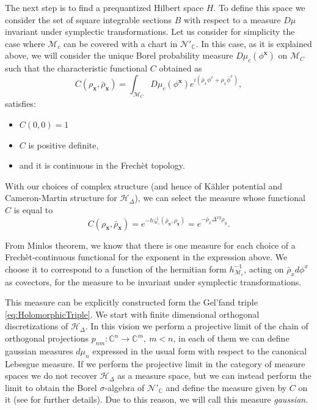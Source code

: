 \documentclass[12pt]{article}%
\begin{document}
The next step is to find a prequantized Hilbert space $H$. To define this space we consider the set of square integrable sections $B$ with respect to a measure $D\mu$ invariant under symplectic transformations. Let us consider for simplicity the case where $\mathcal{M}_c$ can be covered with a chart in $\mathcal{N}'_\mathbb{C}$. In this case, as it is explained above, we will consider the unique Borel probability measure $D\mu_c(\phi^\mathbf{x})$ on $\mathcal{M}_C$ such that the characteristic functional $C$ obtained as  
\begin{equation}
\label{eq:gaussianmeasure}
C(\rho_{\mathbf{x}}, \bar \rho_{\mathbf{x}})=\int_{\mathcal{M}_C}D\mu_c(\phi^\mathbf{x} )e^{i (\bar\rho_x\phi^x+\rho_x\bar \phi^x) },
\end{equation}
satisfies:
\begin{itemize}
    \item $C(0,0)=1$
    \item $C$ is positive definite,
    \item and it is continuous in the Frechèt topology.
\end{itemize}

 
   With our choices of complex structure (and hence of Kähler potential and Cameron-Martin structure for $\mathcal{H}_\Delta$),  we can select the measure whose functional $C$ is equal to
\begin{equation}
\label{eq:C}
C(\rho_\mathbf{x}, \bar \rho_\mathbf{x})=e^{-h^{-1}_{\mathcal{M}_c}(\bar \rho_\mathbf{x}, \rho_\mathbf{x})}= e^{-\bar \rho_{x}\Delta^{xy} \rho_{y}}.
\end{equation}

From Minlos theorem, we know that there is one measure for each choice of a Frechèt-continuous functional for the exponent in the expression above.  We choose it to correspond to a function of the hermitian form   $h^{-1}_{\mathcal{M}_c}$, acting on  $\bar\rho_x d\phi^x$ as covectors, for the measure to be invariant under symplectic transformations. 

This measure can be explicitly constructed form the Gel'fand triple \eqref{eq:HolomorphicTriple}. We start with finite dimensional orthogonal discretizations of $\mathcal{H}_\Delta$. In this vision we perform a projective limit of the chain of orthogonal projections  $p_{nm}:\mathbb{C}   ^n\to \mathbb{C}^m,\ m<n$, in each of them we can define gaussian measures $d\mu_n$ expressed in the usual form with respect to the canonical Lebesgue measure.  If we perform the projective limit in the category of measure spaces we do not recover $\mathcal{H}_\Delta$ as a measure space, but we can instead perform the limit to obtain the Borel $\sigma$-algebra of  $\mathcal{N}'_\mathbb{C}$ and define the measure given by $C$ on it  (see \cite{Oeckl2012a,Gellfand} for further details). Due to this reason, we will call this measure \textit{gaussian}.
\end{document}
